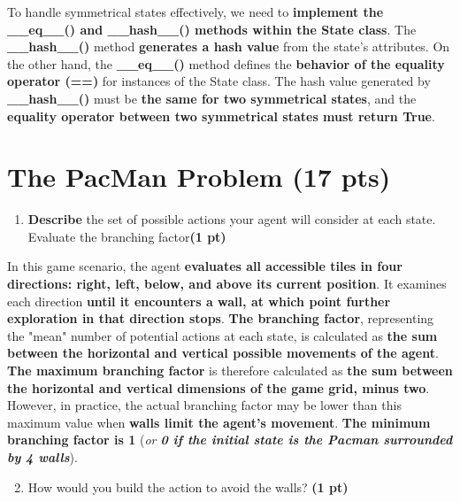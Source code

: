 \documentclass[11pt,a4paper]{report}
\begin{document}
\begin{answer}
To handle symmetrical states effectively, we need to \textbf{implement the \_\_eq\_\_() and \_\_hash\_\_() methods within the State class}.
The \textbf{\_\_hash\_\_()} method \textbf{generates a hash value} from the state's attributes.
On the other hand, the \textbf{\_\_eq\_\_()} method defines the \textbf{behavior of the equality operator (==)} for instances of the State class.
The hash value generated by \textbf{\_\_hash\_\_()} must be \textbf{the same for two symmetrical states}, and the \textbf{equality operator between two symmetrical states must return True}.
\end{answer}




\section{The 
PacMan Problem (17 pts)}

\begin{enumerate}
\setcounter{enumi}{1}
\begin{enumerate}
\item \textbf{Describe} the set of possible actions your agent will consider at each state. Evaluate the branching factor\textbf{(1 pt)}
\end{enumerate}
  
\end{enumerate}

\begin{answer}
{\footnotesize In this game scenario, the agent \textbf{evaluates all accessible tiles in four directions: right, left, below, and above its current position}. It examines each direction \textbf{until it encounters a wall, at which point further exploration in that direction stops}. \textbf{The branching factor}, representing the "mean" number of potential actions at each state, is calculated as \textbf{the sum between the horizontal and vertical possible movements of the agent}. \textbf{The maximum branching factor} is therefore calculated as \textbf{the sum between the horizontal and vertical dimensions of the game grid, minus two}. However, in practice, the actual branching factor may be lower than this maximum value when \textbf{walls limit the agent's movement}. \textbf{The minimum branching factor is 1} (\textit{or \textbf{0 if the initial state is the Pacman surrounded by 4 walls}}).}
\end{answer}
\begin{enumerate}
\setcounter{enumi}{1}
\begin{enumerate}
\setcounter{enumii}{1}
    \item  How would you build the action to avoid the walls? \textbf{(1 pt)}
\end{enumerate}
  
\end{enumerate}
\end{document}
